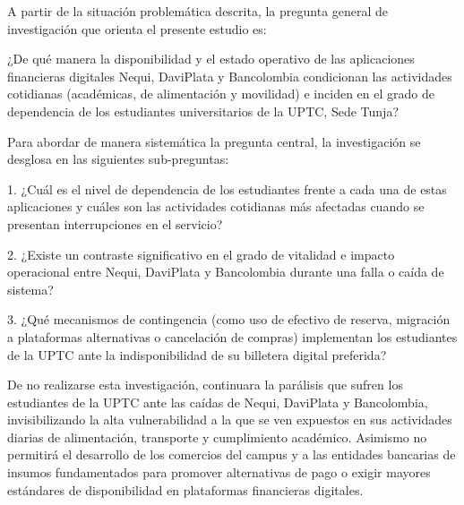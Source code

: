 \vspace{1em}

\hypertarget{sec:formulacion}{}%
\par
A partir de la situación problemática descrita, la pregunta general de investigación que orienta el presente estudio es:

¿De qué manera la disponibilidad y el estado operativo de las aplicaciones financieras digitales Nequi, DaviPlata y Bancolombia condicionan  las actividades cotidianas (académicas, de alimentación y movilidad) e inciden en el grado de dependencia de los estudiantes universitarios de la UPTC, Sede Tunja?

Para abordar de manera sistemática la pregunta central, la investigación se desglosa en las siguientes sub-preguntas:

1.	¿Cuál es el nivel de dependencia de los estudiantes frente a cada una de estas aplicaciones y cuáles son las actividades cotidianas más afectadas cuando se presentan interrupciones en el servicio?

2.	¿Existe un contraste significativo en el grado de vitalidad e impacto operacional entre Nequi, DaviPlata y Bancolombia durante una falla o caída de sistema?

3.	¿Qué mecanismos de contingencia (como uso de efectivo de reserva, migración a plataformas alternativas o cancelación de compras) implementan los estudiantes de la UPTC ante la indisponibilidad de su billetera digital preferida?


\vspace{1em}

\hypertarget{sec:consecuencias}{}%
\par
De no realizarse esta investigación, continuara la parálisis que sufren los estudiantes de la UPTC ante las caídas de Nequi, DaviPlata y Bancolombia, invisibilizando la alta vulnerabilidad a la que se ven expuestos en sus actividades diarias de alimentación, transporte y cumplimiento académico. Asimismo no permitirá el desarrollo de los comercios del campus y a las entidades bancarias de insumos fundamentados para promover alternativas de pago o exigir mayores estándares de disponibilidad en plataformas financieras digitales.

\vspace{1em}

\hypertarget{sec:delimitacion}{}%
\par

